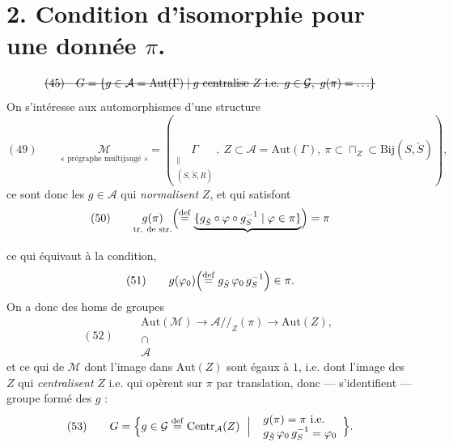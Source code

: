 \documentclass[11pt,a4paper]{article}
\begin{document}
\section*{2. Condition d'isomorphie pour une donnée $\pi$.}

\[
\text{\struck{$(45) \quad G = \{g \in \mathcal{A} = \mathrm{Aut}(\Gamma) \mid g \text{ centralise } Z \text{ i.e. } g \in \mathcal{G},\ g(\pi) = \ldots\}$}}
\]
On s'intéresse aux automorphismes d'une structure \struck{\ill{}}
\[
(49) \qquad \underset{\text{« prégraphe multijaugé »}}{\mathcal{M}} = (\underset{\substack{\| \\ (S, \check{S}, R)}}{\Gamma},\ Z \subset \mathcal{A} = \mathrm{Aut}(\Gamma),\ \pi \subset \sqcap_Z \subset \mathrm{Bij}(S, \check{S})) ,
\]
ce sont donc les $g \in \mathcal{A}$ qui \emph{normalisent} $Z$, et qui satisfont
\[
(50) \qquad \underset{\text{tr. de str.}}{g(\pi)} \Bigl( \overset{\mathrm{def}}{=} \underbrace{\{g_{\check{S}} \circ \varphi \circ g_S^{-1} \mid \varphi \in \pi\}}_{} \Bigr) = \pi
\]
ce qui équivaut à la condition, \struck{\ill{}} 
\[
(51) \qquad g(\varphi_0) \Bigl( \overset{\mathrm{def}}{=} g_{\check{S}}\, \varphi_0\, g_S^{-1} \Bigr) \in \pi .
\]
On a donc des homs de groupes
\[
(52) \qquad
\begin{array}{c}
\mathrm{Aut}(\mathcal{M}) \longrightarrow \mathcal{A}/\!/_{Z}(\pi) \longrightarrow \mathrm{Aut}(Z) , \\
\cap \\
\mathcal{A}
\end{array}
\]
et  ce qui   de $\mathcal{M}$ dont l'image dans $\mathrm{Aut}(Z)$ sont égaux à $1$, i.e. dont l'image des $Z$ qui \emph{centralisent} $Z$ i.e. qui opèrent sur $\pi$ par translation, \struck{\ill{}} donc --- s'identifient --- groupe formé des $g$ :
\[
(53) \qquad G = \Bigl\{ g \in \mathcal{G} \overset{\mathrm{def}}{=} \mathrm{Centr}_{\mathcal{A}}(Z) \ \Bigm|\ 
\begin{array}{l}
g(\pi) = \pi \text{ i.e.} \\
g_{\check{S}}\, \varphi_0\, g_S^{-1} = \varphi_0
\end{array}
\Bigr\} .
\]
\end{document}
